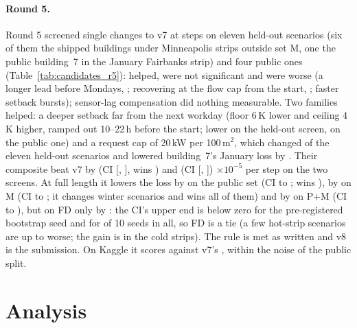 \documentclass{article}
\begin{document}
\paragraph{Round 5.}
Round 5 screened \RFiveNSingles{} single changes to v7 at \RFiveScreenSteps{} steps on eleven held-out
scenarios (six of them the shipped buildings under Minneapolis strips outside set M, one the public
building~7 in the January Fairbanks strip) and four public ones (Table~\ref{tab:candidates_r5}):
\RFiveNHelps{} helped, \RFiveNNs{} were not significant and \RFiveNWorse{} were worse (a longer lead before
Mondays, \RFiveMonHeldRelAbs; recovering at the flow cap from the start, \RFivePreburstHeldRelAbs; faster
setback bursts); sensor-lag compensation did nothing measurable. Two families helped: a deeper
setback far from the next workday (floor 6\,K lower and ceiling 4\,K higher, ramped out 10--22\,h before the
start; \RFiveWkHeldRelAbs{} lower on the held-out screen, \RFiveWkPubRelAbs{} on the public one) and a request
cap of 20\,kW per 100\,m$^2$, which changed \RFiveQcapNChanged{} of the eleven held-out scenarios and lowered
building~7's January loss by \RFiveQcapBSevenRelAbs. Their composite beat v7 by \RFiveChosenHeldD{} (CI [\RFiveChosenHeldLo,
\RFiveChosenHeldHi], wins \RFiveChosenHeldWins) and \RFiveChosenPubD{} (CI [\RFiveChosenPubLo,
\RFiveChosenPubHi]) $\times10^{-5}$ per step on the two screens. At full length it lowers the loss by \RFiveConfPubRelAbs{} on the public set (CI
\RFiveConfPubRelHiAbs{} to \RFiveConfPubRelLoAbs; wins \RFiveConfPubWins), by \RFiveConfMinnRelAbs{} on M (CI
\RFiveConfMinnRelHiAbs{} to \RFiveConfMinnRelLoAbs; it changes \RFiveConfMinnNChanged{} winter scenarios and wins all of
them) and by \RFiveConfPubMinnRelAbs{} on P+M (CI \RFiveConfPubMinnRelHiAbs{} to \RFiveConfPubMinnRelLoAbs), but on FD
only by \RFiveConfFreshDefRelAbs{}: the CI's upper end is below zero for the pre-registered bootstrap seed and for
\RFiveSeedsFreshDefBelow{} of 10 seeds in all, so FD is a tie (a few hot-strip scenarios are up to
\RFiveConfFreshDefWorstRelAbs{} worse; the gain is in the cold strips). The rule is met as written and v8 is the
submission. On Kaggle it scores \RFiveKagVEight{} against v7's \RFiveKagVSeven, within the noise of the public split.

\section{Analysis}
\label{sec:analysis}
\end{document}
